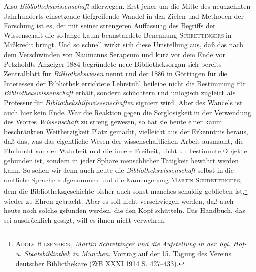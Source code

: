 \documentclass[a4paper,
fontsize=11pt,
oneside,
numbers=noperiodatend,
parskip=half-,
bibliography=totoc,
final
]{scrartcl}
\begin{document}
Also \emph{Bibliothekswissenschaft} allerwegen. Erst jener um die Mitte
des neunzehnten Jahrhunderts einsetzende tiefgreifende Wandel in den
Zielen und Methoden der Forschung ist es, der mit seiner strengeren
Auffassung des Begriffs der Wissenschaft die so lange kaum beanstandete
Benennung \textsc{Schrettingers} in Mißkredit bringt. Und so schnell
wirkt sich diese Umstellung aus, daß das nach dem Verschwinden von
Naumanns Serapeum und kurz vor dem Ende von Petzholdts Anzeiger 1884
begründete neue Bibliotheksorgan sich bereits Zentralblatt für
\emph{Bibliothekswesen} nennt und der 1886 in Göttingen für die
Interessen der Bibliothek errichtete Lehrstuhl beileibe nicht die
Bestimmung für \emph{Bibliothekswissenschaft} erhält, sondern schüchtern
und unlogisch zugleich als Professur für
\emph{Bibliothekshilfswissenschaften} signiert wird. Aber des Wandels
ist auch hier kein Ende. War die Reaktion gegen die Sorglosigkeit in der
Verwendung des Wortes \emph{Wissenschaft} zu streng gewesen, so hat sie
heute einer kaum beschränkten Weitherzigkeit Platz gemacht, vielleicht
aus der Erkenntnis heraus, daß das, was das eigentliche Wesen der
wissenschaftlichen Arbeit ausmacht, die Ehrfurcht vor der Wahrheit und
die innere Freiheit, nicht an bestimmte Objekte gebunden ist, sondern in
jeder Sphäre menschlicher Tätigkeit bewährt werden kann. So sehen wir
denn auch heute die \emph{Bibliothekswissenschaft} selbst in die
amtliche Sprache aufgenommen und die Namengebung \textsc{Martin
Schrettingers}, dem die Bibliotheksgeschichte bisher auch sonst manches
schuldig geblieben ist,\footnote{\textsc{Adolf Hilsenbeck}, \emph{Martin
  Schrettinger und die Aufstellung in der Kgl. Hof- u. Staatsbibliothek
  in München}. Vortrag auf der 15. Tagung des Vereins deutscher
  Bibliothekare (ZfB XXXI 1914 S. 427--433).} wieder zu Ehren gebracht.
Aber es soll nicht verschwiegen werden, daß auch heute noch solche
gefunden werden, die den Kopf schütteln. Das Handbuch, das sei
ausdrücklich gesagt, will es ihnen nicht verwehren.
\end{document}
